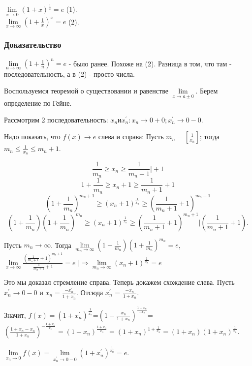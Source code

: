 	\opred
	$\lim\limits_{x\rightarrow 0}(1+x)^\frac{1}{x}=e$ (1).
	\\
	$\lim\limits_{x\rightarrow \infty}(1+\frac{1}{x})^x=e$ (2).
	\subsubsection{Доказательство}
	$\lim\limits_{n\rightarrow \infty}(1+\frac{1}{n})^n=e$ - было ранее. Похоже на (2).
	Разница в том, что там - последовательность, а в (2) - просто числа.
	
	Воспользуемся теоремой о существовании и равенстве $\lim\limits_{x\rightarrow a\pm 0}$. Берем определение по Гейне.
	
	Рассмотрим 2 последовательность: $x_n и x_n^{'}: x_n \rightarrow 0 + 0; x_n^{'} \rightarrow 0-0$. 
	
	Надо показать, что $f(x)\rightarrow e$ слева и справа:
	Пусть $m_n =  [\frac{1}{x_n}]$; тогда $m_n \leq \frac{1}{x_n} \leq m_n + 1$.
	
	$$\frac{1}{m_n} \geq x_n \geq \frac{1}{m_n + 1} \bigg| +1$$
	$$ 1 + \frac{1}{m_n} \geq x_n + 1 \geq \frac{1}{m_n + 1} + 1$$
	$$\left(1 + \frac{1}{m_n}\right)^{m_n+1} \geq (x_n + 1)^{\frac{1}{x_n}} \geq \left(\frac{1}{m_n + 1} + 1\right)^{m_n+1}$$
	$$\left(1 + \frac{1}{m_n}\right)\left(1 + \frac{1}{m_n}\right)^{m_n} \geq (x_n + 1)^{\frac{1}{x_n}} \geq \left(\frac{1}{m_n + 1} + 1\right)^{m_n+1}
	\bigg| \left(\frac{1}{m_n + 1} + 1\right).$$
	
	Пусть $m_n \rightarrow \infty$.
	Тогда $\lim\limits_{m_n\rightarrow\infty}\left(1+\frac{1}{m_n}\right)\left(1+\frac{1}{m_n}\right)^{m_n}=e$, 
	$\lim\limits_{x\rightarrow\infty}\frac{\left(\frac{1}{m_n + 1} + 1\right)^{m_n+1}}{\frac{1}{m_n + 1} + 1}=e$
	$\bigg| \Rightarrow \lim\limits_{m_n\rightarrow\infty}(x_n + 1)^{\frac{1}{x_n}}=e$
	
	Это мы доказал стремление справа. Теперь докажем схождение слева. Пусть $x_n^{'} \rightarrow 0-0$ и 
	$x_n = \frac{-x_n^{'}}{1+x_n^{'}}$. Отсюда $x_n^{'}$ = $\frac{-x_n}{1+x_n}$.
	
	Значит, $f(x)=(1+x_n^{'})^{\frac{1}{x_n^{'}}}$=$\left(1 - \frac{x_n}{1+x_n}\right)^\frac{1+x_n}{-x_n}$=
	$\left(\frac{1+x_n-x_n}{1+x_n}\right)^{-\frac{1+x_n}{x_n}}=(1+x_n)^{\frac{1+x_n}{x_n}}=
	(1+x_n)^{1+\frac{1}{x_n}}=(1+x_n)(1+x_n)^{\frac{1}{x_n}}$.
	
	$\lim\limits_{x_n\rightarrow0}f(x)=\lim\limits_{x_n^{'}\rightarrow0-0}(1+x_n^{'})^{\frac{1}{x_n}}=e$.
	
	

 